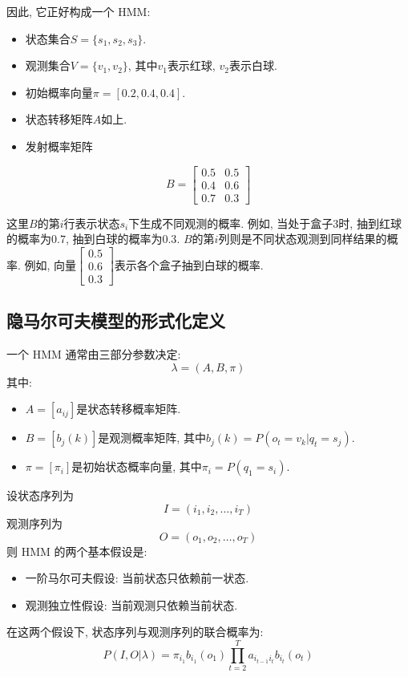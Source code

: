 因此, 它正好构成一个 HMM:

\begin{itemize}
\item 状态集合$S = \{s_1, s_2, s_3\}$.
\item 观测集合$V = \{v_1, v_2\}$, 其中$v_1$表示红球, $v_2$表示白球.
\item 初始概率向量$\pi = [0.2, 0.4, 0.4]$.
\item 状态转移矩阵$A$如上.
\item 发射概率矩阵
\end{itemize}
\[
B = \begin{bmatrix}0.5 & 0.5 \\ 0.4 & 0.6 \\ 0.7 & 0.3\end{bmatrix}
\]

这里$B$的第$i$行表示状态$s_i$下生成不同观测的概率.
例如, 当处于盒子$3$时, 抽到红球的概率为$0.7$, 抽到白球的概率为$0.3$.
$B$的第$i$列则是不同状态观测到同样结果的概率.
例如, 向量$\begin{bmatrix}0.5 \\ 0.6 \\ 0.3\end{bmatrix}$表示各个盒子抽到白球的概率.

\subsection{隐马尔可夫模型的形式化定义}


一个 HMM 通常由三部分参数决定:
\[
\lambda = (A, B, \pi)
\]
其中:

\begin{itemize}
\item $A = [a_{i j}]$是状态转移概率矩阵.
\item $B = [b_j (k)]$是观测概率矩阵, 其中$b_j (k) = P(o_t = v_k | q_t = s_j)$.
\item $\pi = [\pi_i]$是初始状态概率向量, 其中$\pi_i = P(q_1 = s_i)$.
\end{itemize}

设状态序列为
\[
I = (i_1, i_2, \dots, i_T)
\]
观测序列为
\[
O = (o_1, o_2, \dots, o_T)
\]
则 HMM 的两个基本假设是:

\begin{itemize}
\item 一阶马尔可夫假设: 当前状态只依赖前一状态.
\item 观测独立性假设: 当前观测只依赖当前状态.
\end{itemize}

在这两个假设下, 状态序列与观测序列的联合概率为:
\[
P(I, O | \lambda)
    = \pi_{i_1} b_{i_1}(o_1) \prod_{t=2}^T a_{i_{t-1} i_t} b_{i_t}(o_t)
\]


